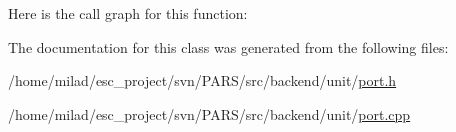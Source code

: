 Here is the call graph for this function:




The documentation for this class was generated from the following files:\begin{DoxyCompactItemize}
\item 
/home/milad/esc\_\-project/svn/PARS/src/backend/unit/\hyperlink{port_8h}{port.h}\item 
/home/milad/esc\_\-project/svn/PARS/src/backend/unit/\hyperlink{port_8cpp}{port.cpp}\end{DoxyCompactItemize}
